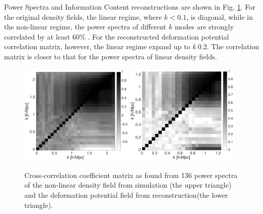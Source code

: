 \begin{section}{Power Spectra and Information Content}
reconstructions are shown in Fig. \ref{fig:corrall}. For the original density fields, the
linear regime, where $k<0.1$, is diagonal, while in the non-linear regime, the power spectra of
different $k$ modes are strongly correlated by at least $60\%$ . For the reconstructed deformation
potential correlation matrix, however, the linear regime expand up to $k~0.2$. The correlation
matrix is closer to that for the power spectra of linear density fields.
\begin{figure}
 \centering
  \includegraphics[width=0.48\textwidth]{corrmatrix_good-crop.pdf}
  \includegraphics[width=0.48\textwidth]{corr_cut-crop.pdf}
  \caption{Cross-correlation coefficient matrix as found from 136 power spectra of the non-linear
density field from simulation (the upper triangle) and the deformation potential field from
reconstruction(the lower triangle).}

    \label{fig:corrall}
\end{figure}



\end{section}
